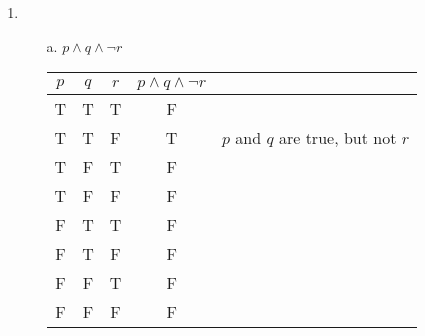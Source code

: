 \begin{enumerate}
        \item
            \begin{itemize}
                \item[a.]   $p \land q \land \neg r$ \\
                            \begin{tabular}{c c c | c  l}
                                $p$ & $q$ & $r$     & $p \land q \land \neg r$
                                \\ \hline
                                    T & T & T           & F
                                \\  T & T & F           & T & $p$ and $q$ are true, but not $r$
                                \\  T & F & T           & F
                                \\  T & F & F           & F
                                \\  F & T & T           & F
                                \\  F & T & F           & F
                                \\  F & F & T           & F
                                \\  F & F & F           & F
                                
                            \end{tabular}
                            

\end{itemize}
\end{enumerate}
